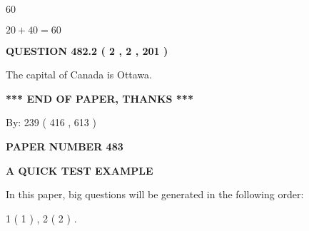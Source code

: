 \documentclass[12pt]{article}
\begin{document}
60
 
 
 
 
\noindent{}

$ %
20 +  %
40=   %
60$
 
 
  
\vspace{0.2in}
  
{\textbf{\Large{QUESTION
482.2 
 ( 2 , 2 , 201 )
}}}
  
  
 
 
\noindent{}
 
 
The capital of Canada is Ottawa.
 
 
 
 
   
   
 \vspace{0.2in}
 
   
   
   
   
\vspace{1.0in} 
{\textbf{\large{ *** END OF PAPER, THANKS *** }}} 
   
   
\hspace{1.0in} By: 
 239 ( 416 ,  613 )
   
   
   
   
\newpage 
\setcounter{page}{ 
   483001 } 
   
   
   
   
 {\textbf{ \Large{ PAPER NUMBER  483  }}}
   
   
\vspace{0.2in}
   
   
   
   
   
   
 \vspace{0.2in}
{\LARGE {\textbf{ A QUICK TEST EXAMPLE}}}
   
   
   
\vspace{0.2in}
   
In this paper, big questions will be generated in the following order: 
   
   
   1 ( 1 )
 ,
   2 ( 2 )
 .
  
\vspace{0.2in}
  
\end{document}
